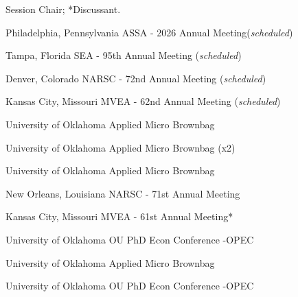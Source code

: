 \textdagger Session Chair; *Discussant.


{%
	Philadelphia, Pennsylvania}
{%
	ASSA - 2026 Annual Meeting\ec (\textit{scheduled})}
{}


{%
	Tampa, Florida}
{%
	SEA - 95th Annual Meeting (\textit{scheduled})}
{}


{%
	Denver, Colorado}
{%
	NARSC - 72nd Annual Meeting (\textit{scheduled})}
{}

{%
	Kansas City, Missouri}
{%
	MVEA - 62nd Annual Meeting (\textit{scheduled})}
{}

{%
	University of Oklahoma}
{%
	Applied Micro Brownbag }
{}

{%
	University of Oklahoma}
{%
	Applied Micro Brownbag (x2)}
{}

{%
	University of Oklahoma}
{%
	Applied Micro Brownbag}
{}

{%
	New Orleans, Louisiana}
{%
	NARSC - 71st Annual Meeting\ec}
{}

{%
	Kansas City, Missouri}
{%
	MVEA - 61st Annual Meeting*}
{}


{%
	University of Oklahoma}
{%
	OU PhD Econ Conference -OPEC}
{}

{%
	University of Oklahoma}
{%
	Applied Micro Brownbag}
{}

{%
	University of Oklahoma}
{%
	OU PhD Econ Conference -OPEC}
{}